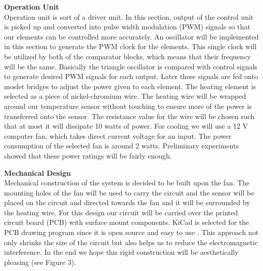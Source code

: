 \documentclass{METUHW} %
\begin{document}
\justifying

\textbf{ \normalsize Operation Unit}\\
    Operation unit is sort of a driver unit. In this section, output of the control unit is picked up and converted into pulse width modulation (PWM) signals so that our elements can be controlled more accurately. An oscillator will be implemented in this section to generate the PWM clock for the elements. This single clock will be utilized by both of the comparator blocks, which means that their frequency will be the same. Basically the triangle oscillator is compared with control signals to generate desired PWM signals for each output. Later these signals are fed onto mosfet bridges to adjust the power given to each element. The heating element is selected as a piece of nickel-chromium wire. The heating wire will be wrapped around our temperature sensor without touching to ensure more of the power is transferred onto the sensor. The resistance value for the wire will be chosen such that at most it will dissipate 10 watts of power. For cooling we will use a 12 V computer fan, which takes direct current voltage for an input. The power consumption of the selected fan is around 2 watts. Preliminary experiments showed that these power ratings will be fairly enough.\\
    
\medskip

\textbf{ \normalsize Mechanical Design}\\
Mechanical construction of the system is decided to be built upon the fan. The mounting holes of the fan will be used to carry the circuit and the sensor will be placed on the circuit and directed towards the fan and it will be surrounded by the heating wire. For this design our circuit will be carried over the printed circuit board (PCB) with surface mount components. KiCad is selected for the PCB drawing program since it is open source and easy to use . This approach not only shrinks the size of the circuit but also helps us to reduce the electromagnetic interference. In the end we hope this rigid construction will be aesthetically pleasing (see Figure 3).\\
\end{document}
